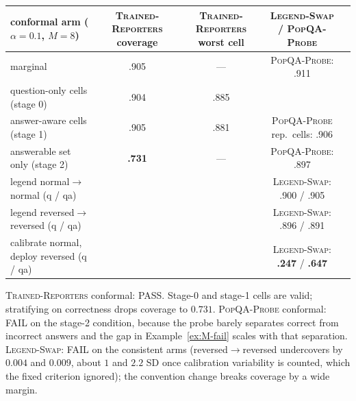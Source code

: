 \documentclass[11pt]{article}
\theoremstyle{definition}
\theoremstyle{remark}
\newcommand{\1}{\mathbf{1}}
\newcommand{\expname}[1]{\textsc{#1}}
\begin{document}
\begin{center}\small
\begin{tabular}{lcccc}
\toprule
conformal arm ($\alpha=0.1$, $M=8$) & \expname{Trained-Reporters} coverage & \expname{Trained-Reporters} worst cell & \expname{Legend-Swap} / \expname{PopQA-Probe} & \\
\midrule
marginal & .905 & --- & \expname{PopQA-Probe}: .911 & \\
question-only cells (stage 0) & .904 & .885 & & \\
answer-aware cells (stage 1) & .905 & .881 & \expname{PopQA-Probe} rep.\ cells: .906 & \\
answerable set only (stage 2) & \textbf{.731} & --- & \expname{PopQA-Probe}: .897 & \\
legend normal$\to$normal (q / qa) & & & \expname{Legend-Swap}: .900 / .905 & \\
legend reversed$\to$reversed (q / qa) & & & \expname{Legend-Swap}: .896 / .891 & \\
calibrate normal, deploy reversed (q / qa) & & & \expname{Legend-Swap}: \textbf{.247} / \textbf{.647} & \\
\bottomrule
\end{tabular}
\end{center}
\expname{Trained-Reporters} conformal: PASS. Stage-0 and stage-1 cells are valid; stratifying on correctness drops coverage
to $0.731$. \expname{PopQA-Probe} conformal: FAIL on the stage-2 condition, because the probe barely separates correct
from incorrect answers and the gap in Example~\ref{ex:M-fail} scales with that separation.
\expname{Legend-Swap}: FAIL on the consistent arms (reversed$\to$reversed undercovers by $0.004$ and $0.009$, about
$1$ and $2.2$ SD once calibration variability is counted, which the fixed criterion ignored); the
convention change breaks coverage by a wide margin.
\end{document}
